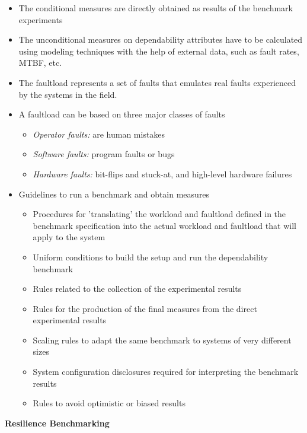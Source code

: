 \begin{itemize}
\begin{itemize}
  \end{itemize}
  \item The conditional measures are directly obtained as results of the benchmark experiments
  \item The unconditional measures on dependability attributes have to be calculated using modeling techniques with the help of external data, such as fault rates, MTBF, etc.
  \item The faultload represents a set of faults that emulates real faults experienced by the systems in the field.
  \item A faultload can be based on three major classes of faults
  \begin{itemize}
  	\item \textit{Operator faults:} are human mistakes
  	\item \textit{Software faults:} program faults or bugs
  	\item \textit{Hardware faults:} bit-flips and stuck-at, and high-level hardware failures
  \end{itemize}
  \item Guidelines to run a benchmark and obtain measures
  \begin{itemize}
  \item Procedures for 'translating' the workload and faultload defined in the benchmark specification into the actual workload and faultload that will apply to the system
  \item Uniform conditions to build the setup and run the dependability benchmark
  \item Rules related to the collection of the experimental results
  \item Rules for the production of the final measures from the direct experimental results
  \item Scaling rules to adapt the same benchmark to systems of very different sizes
  \item System configuration disclosures required for interpreting the benchmark results
  \item Rules to avoid optimistic or biased results
\end{itemize}
\end{itemize}

\textbf{Resilience Benchmarking}

